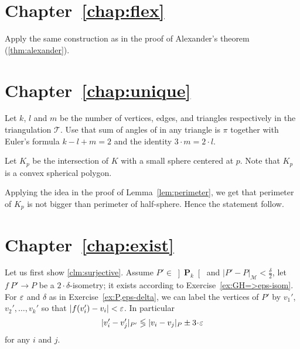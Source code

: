 \section*{Chapter~\ref{chap:flex}}




Apply the same construction as in the proof of Alexander's theorem (\ref{thm:alexander}).

\section*{Chapter~\ref{chap:unique}}



 Let $k$, $l$ and $m$  be the number of vertices, edges, and triangles respectively in the triangulation $\mathcal{T}$. 
Use that sum of angles of in any triangle is $\pi$
together with Euler's formula 
$k-l+m=2$ and the identity $3\cdot m=2\cdot l$.

Let $K_p$ be the intersection of $K$ with a small sphere centered at $p$.
Note that $K_p$ is a convex spherical polygon.

Applying  the idea in the proof of Lemma~\ref{lem:perimeter},
we get that perimeter of $K_p$ is not bigger than 
perimeter of half-sphere.
Hence the statement follow.








\section*{Chapter~\ref{chap:exist}}

Let us first show \ref{clm:surjective}.
Assume $P'\in\left] \mathbf{P}_k\right[$ 
and $|P'-P|_\mathcal{M}<\tfrac\delta2$,
let $f\:P'\to P$ be a $2\cdot\delta$-isometry;
it exists according to Exercise~\ref{ex:GH=>eps-isom}.
For $\varepsilon$ and $\delta$ as in Exercise~\ref{ex:P,eps-delta},
we can label the vertices of $P'$ 
by $v_1'$, $v_2',\dots,v_k'$ so that 
$|f(v_i')-v_i|<\varepsilon$.
In particular 
$$|v'_i-v'_j|_{P'}\lege|v_i-v_j|_{P}\pm 3\cdot\eps$$
for any $i$ and $j$.


